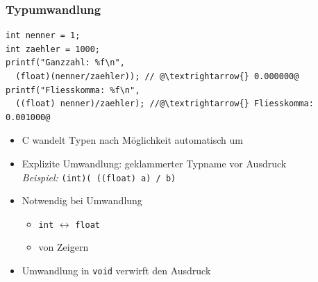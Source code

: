 \documentclass{slides}
\begin{document}
\begin{frame}[fragile]
  \frametitle{Typumwandlung}

\begin{lstlisting}
int nenner = 1;
int zaehler = 1000;
printf("Ganzzahl: %f\n",
  (float)(nenner/zaehler)); // @\textrightarrow{} 0.000000@
printf("Fliesskomma: %f\n",
  ((float) nenner)/zaehler); //@\textrightarrow{} Fliesskomma: 0.001000@
\end{lstlisting}

  \begin{itemize}
  \item C wandelt Typen nach Möglichkeit automatisch um
  \item Explizite Umwandlung: geklammerter Typname vor Ausdruck\\
    \emph{Beispiel:} \lstinline!(int)( ((float) a) / b)!
  \item Notwendig bei Umwandlung
    \begin{itemize}
    \item \lstinline!int! \ensuremath{\leftrightarrow}{} \lstinline!float!
    \item von Zeigern
    \end{itemize}
  \item Umwandlung in \lstinline!void! verwirft den Ausdruck
  \end{itemize}
\end{frame}
\end{document}
